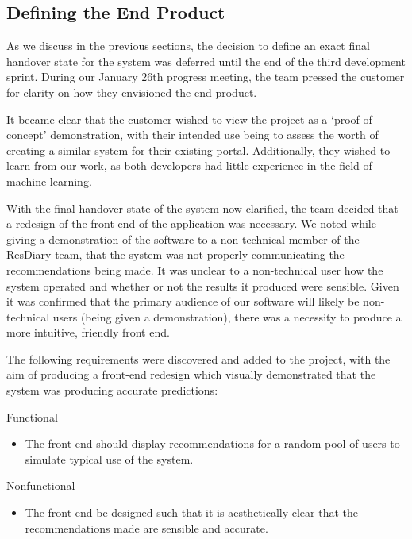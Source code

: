 \documentclass{l3proj}
\begin{document}
\subsection{Defining the End Product}
\label{sec:jandefinedstate}

As we discuss in the previous sections, the decision to define an exact final handover state for the system was deferred until the end of the third development sprint. During our January 26th progress meeting, the team pressed the customer for clarity on how they envisioned the end product. 

It became clear that the customer wished to view the project as a `proof-of-concept' demonstration, with their intended use being to assess the worth of creating a similar system for their existing portal. Additionally, they wished to learn from our work, as both developers had little experience in the field of machine learning.

With the final handover state of the system now clarified, the team decided that a redesign of the front-end of the application was necessary. We noted while giving a demonstration of the software to a non-technical member of the ResDiary team, that the system was not properly communicating the recommendations being made. It was unclear to a non-technical user how the system operated and whether or not the results it produced were sensible. Given it was confirmed that the primary audience of our software will likely be non-technical users (being given a demonstration), there was a necessity to produce a more intuitive, friendly front end. 

The following requirements were discovered and added to the project, with the aim of producing a front-end redesign which visually demonstrated that the system was producing accurate predictions:

Functional
\begin{itemize}
\item The front-end should display recommendations for a random pool of users to simulate typical use of the system.
\end{itemize}

Nonfunctional
\begin{itemize}
\item The front-end be designed such that it is aesthetically clear that the recommendations made are sensible and accurate.
\end{itemize}
\end{document}
